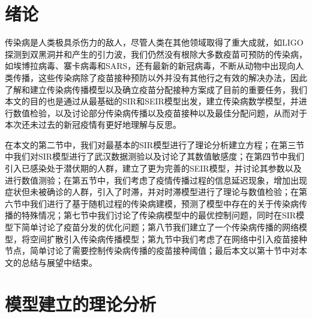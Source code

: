\documentclass[UTF8]{ctexart}
\begin{document}
	\section{绪论}
	传染病是人类极具杀伤力的敌人，尽管人类在其他领域取得了重大成就，如LIGO探测到双黑洞并和产生的引力波，我们仍然没有根除大多数疫苗可预防的传染病，如埃博拉病毒、寨卡病毒和SARS，还有最新的新冠病毒，不断从动物中出现向人类传播，这些传染病除了疫苗接种预防以外并没有其他行之有效的解决办法，因此了解和建立传染病传播模型以及确立疫苗分配接种方案成了目前的重要任务，我们本文的目的也是通过从最基础的SIR和SEIR模型出发，建立传染病数学模型，并进行数值检验，以及讨论部分传染病传播以及疫苗接种以及最佳分配问题，从而对于本次还未过去的新冠疫情有更好地理解与反思。
	\par 在本文的第二节中，我们对最基本的SIR模型进行了理论分析建立方程；在第三节中我们对SIR模型进行了武汉数据测验以及讨论了其数值敏感度；在第四节中我们引入已感染处于潜伏期的人群，建立了更为完善的SEIR模型，并讨论其参数以及进行数值测验；在第五节中，我们考虑了疫情传播过程的信息延迟现象，增加出现症状但未被确诊的人群，引入了时滞，并对时滞模型进行了理论与数值检验；在第六节中我们进行了基于随机过程的传染病建模，预测了模型中存在的关于传染病传播的特殊情况；第七节中我们讨论了传染病模型中的最优控制问题，同时在SIR模型下简单讨论了疫苗分发的优化问题；第八节我们建立了一个传染病传播的网络模型，将空间扩散引入传染病传播模型；第九节中我们考虑了在网络中引入疫苗接种节点，简单讨论了需要控制传染病传播的疫苗接种阈值；最后本文以第十节中对本文的总结与展望中结束。	
	    \section{模型建立的理论分析}
\end{document}
